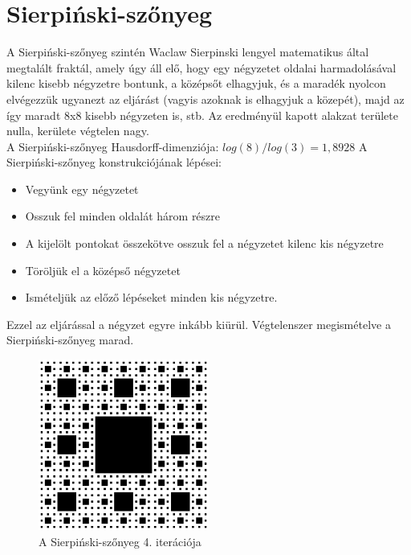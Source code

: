 \section*{Sierpiński-szőnyeg}
A Sierpiński-szőnyeg szintén Waclaw Sierpinski lengyel matematikus által megtalált fraktál, amely úgy áll elő, hogy egy négyzetet oldalai harmadolásával kilenc kisebb négyzetre bontunk, a középsőt elhagyjuk, és a maradék nyolcon elvégezzük ugyanezt az eljárást (vagyis azoknak is elhagyjuk a közepét), majd az így maradt 8x8 kisebb négyzeten is, stb. Az eredményül kapott alakzat területe nulla, kerülete végtelen nagy.\\ 
A Sierpiński-szőnyeg Hausdorff-dimenziója: $log(8)/log(3) = 1,8928$
A Sierpiński-szőnyeg konstrukciójának lépései:
\begin{itemize}
	\item Vegyünk egy négyzetet
	\item Osszuk fel minden oldalát három részre
	\item A kijelölt pontokat összekötve osszuk fel a négyzetet kilenc kis négyzetre
	\item Töröljük el a középső négyzetet
	\item Ismételjük az előző lépéseket minden kis négyzetre.
\end{itemize}
Ezzel az eljárással a négyzet egyre inkább kiürül. Végtelenszer megismételve a Sierpiński-szőnyeg marad.
\begin{figure}[!ht]
	\begin{center}
		\includegraphics[width=0.5\textwidth]{img/SierpinskiCarpet}
		\caption[labelInTOC]{A Sierpiński-szőnyeg 4. iterációja}
	\end{center}
\end{figure}
